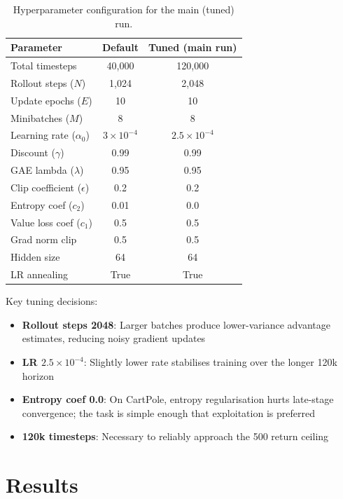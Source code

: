 \documentclass[12pt,a4paper]{article}
\begin{document}
\begin{table}[H]
\centering
\caption{Hyperparameter configuration for the main (tuned) run.}
\begin{tabular}{lcc}
\toprule
\textbf{Parameter} & \textbf{Default} & \textbf{Tuned (main run)} \\
\midrule
Total timesteps     & 40{,}000  & 120{,}000 \\
Rollout steps ($N$) & 1{,}024   & 2{,}048   \\
Update epochs ($E$) & 10        & 10        \\
Minibatches ($M$)   & 8         & 8         \\
Learning rate ($\alpha_0$) & $3\times10^{-4}$ & $2.5\times10^{-4}$ \\
Discount ($\gamma$) & 0.99      & 0.99      \\
GAE lambda ($\lambda$) & 0.95   & 0.95      \\
Clip coefficient ($\epsilon$) & 0.2 & 0.2   \\
Entropy coef ($c_2$) & 0.01    & 0.0       \\
Value loss coef ($c_1$) & 0.5  & 0.5       \\
Grad norm clip      & 0.5       & 0.5       \\
Hidden size         & 64        & 64        \\
LR annealing        & True      & True      \\
\bottomrule
\end{tabular}
\end{table}

Key tuning decisions:
\begin{itemize}[noitemsep]
    \item \textbf{Rollout steps 2048}: Larger batches produce lower-variance advantage estimates, reducing noisy gradient updates
    \item \textbf{LR $2.5 \times 10^{-4}$}: Slightly lower rate stabilises training over the longer 120k horizon
    \item \textbf{Entropy coef 0.0}: On CartPole, entropy regularisation hurts late-stage convergence; the task is simple enough that exploitation is preferred
    \item \textbf{120k timesteps}: Necessary to reliably approach the 500 return ceiling
\end{itemize}

\section{Results}
\end{document}
